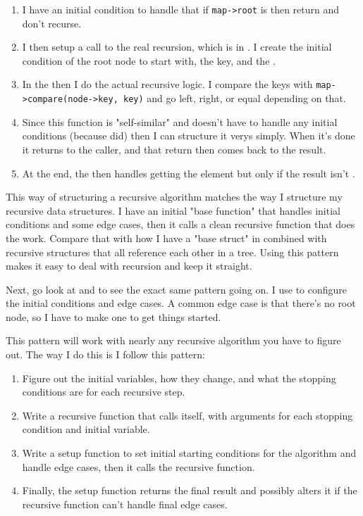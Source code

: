 \begin{enumerate}
\item I have an initial condition to handle that if \verb|map->root|
    is  then return  and don't recurse.
\item I then setup a call to the real recursion, which is in
    .  I create the initial condition of
    the root node to start with, the key, and the .
\item In the  then I do the actual recursive
    logic.  I compare the keys with \verb|map->compare(node->key, key)|
    and go left, right, or equal depending on that.
\item Since this function is "self-similar" and doesn't have to handle
    any initial conditions (because  did) then
    I can structure it verys simply.  When it's done it returns
    to the caller, and that return then comes back to 
    the result.
\item At the end, the  then handles getting the
     element but only if the result isn't .
\end{enumerate}

This way of structuring a recursive algorithm matches the way I structure
my recursive data structures.  I have an initial "base function" that handles
initial conditions and some edge cases, then it calls a clean recursive
function that does the work.  Compare that with how I have a "base struct"
in  combined with recursive  structures
that all reference each other in a tree.  Using this pattern makes it
easy to deal with recursion and keep it straight.

Next, go look at  and  to see
the exact same pattern going on.  I use  to configure
the initial conditions and edge cases.  A common edge case is that there's
no root node, so I have to make one to get things started.

This pattern will work with nearly any recursive algorithm you have to figure
out.  The way I do this is I follow this pattern:

\begin{enumerate}
\item Figure out the initial variables, how they change, and what the stopping
    conditions are for each recursive step.
\item Write a recursive function that calls itself, with arguments for 
    each stopping condition and initial variable.
\item Write a setup function to set initial starting conditions for the
    algorithm and handle edge cases, then it calls the recursive function.
\item Finally, the setup function returns the final result and possibly
    alters it if the recursive function can't handle final edge cases.
\end{enumerate}

